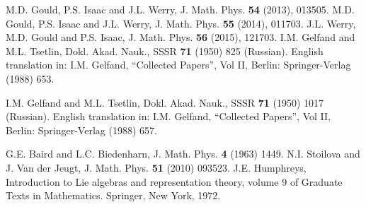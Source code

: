 \documentclass[12pt]{article}
\begin{document}
\begin{thebibliography}{10}

%
%
% 
 M.D. Gould, P.S. Isaac and J.L. Werry, J. Math. Phys. {\bf 54} (2013), 013505.
% 
 M.D. Gould, P.S. Isaac and J.L. Werry, J. Math. Phys. {\bf 55} (2014), 011703.
%
 J.L. Werry, M.D. Gould and P.S. Isaac, J. Math. Phys. {\bf 56} (2015), 121703.
% 
%  
%
% 
%  
%  
I.M. Gelfand and M.L. Tsetlin, Dokl. Akad. Nauk., SSSR {\bf 71} (1950) 825 (Russian).
English translation in: I.M. Gelfand, ``Collected Papers'', Vol II, Berlin:
Springer-Verlag (1988) 653.
  
I.M. Gelfand and M.L. Tsetlin, Dokl. Akad. Nauk., SSSR {\bf 71} (1950) 1017 (Russian).
English translation in: I.M. Gelfand, ``Collected Papers'', Vol II, Berlin:
Springer-Verlag (1988) 657.
  
 G.E. Baird and L.C. Biedenharn, J. Math. Phys. {\bf 4} (1963) 1449.
%  
%  
% 
 N.I. Stoilova and J. Van der Jeugt, J. Math. Phys. {\bf 51} (2010) 093523.
% 
 J.E. Humphreys, Introduction to Lie algebras and representation theory, volume 9 of Graduate Texts in Mathematics. Springer, New York, 1972.



\end{thebibliography}
\end{document}
